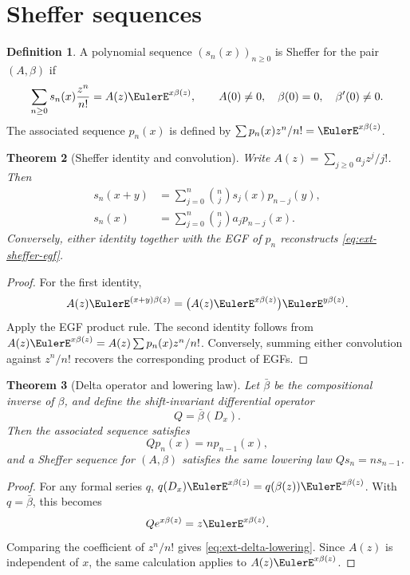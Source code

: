 \documentclass[11pt,a4paper,oneside,openany]{book}
\newtheorem{theorem}{Theorem}[chapter]
\theoremstyle{definition}
\newtheorem{definition}[theorem]{Definition}
\theoremstyle{remark}
\begin{document}
\section{Sheffer sequences}

\begin{definition}
A polynomial sequence \((s_n(x))_{n\ge0}\) is Sheffer for the pair
\((A,\beta)\) if
\begin{equation}\label{eq:ext-sheffer-egf}
 \sum_{n\ge0}s_n(x)\frac{z^n}{n!}
 =A(z)\EulerE^{x\beta(z)},
 \qquad A(0)\ne0,\quad \beta(0)=0,\quad \beta'(0)\ne0.
\end{equation}
The associated sequence \(p_n(x)\) is defined by
\(\sum p_n(x)z^n/n!=\EulerE^{x\beta(z)}\).
\end{definition}

\begin{theorem}[Sheffer identity and convolution]
Write \(A(z)=\sum_{j\ge0}a_jz^j/j!\).  Then
\begin{align}
 s_n(x+y)&=\sum_{j=0}^n\binom nj s_j(x)p_{n-j}(y),
 \label{eq:ext-sheffer-identity}\\
 s_n(x)&=\sum_{j=0}^n\binom nj a_jp_{n-j}(x).
 \label{eq:ext-sheffer-convolution}
\end{align}
Conversely, either identity together with the EGF of \(p_n\) reconstructs
\eqref{eq:ext-sheffer-egf}.
\end{theorem}
\begin{proof}
For the first identity,
\[
 A(z)\EulerE^{(x+y)\beta(z)}
 =\bigl(A(z)\EulerE^{x\beta(z)}\bigr)\EulerE^{y\beta(z)}.
\]
Apply the EGF product rule.  The second identity follows from
\(A(z)\EulerE^{x\beta(z)}=A(z)\sum p_n(x)z^n/n!\).  Conversely, summing either
convolution against \(z^n/n!\) recovers the corresponding product of EGFs.
\end{proof}

\begin{theorem}[Delta operator and lowering law]
Let \(\bar\beta\) be the compositional inverse of \(\beta\), and define the
shift-invariant differential operator
\begin{equation}\label{eq:ext-delta-operator}
 Q=\bar\beta(D_x).
\end{equation}
Then the associated sequence satisfies
\begin{equation}\label{eq:ext-delta-lowering}
 Qp_n(x)=np_{n-1}(x),
\end{equation}
and a Sheffer sequence for \((A,\beta)\) satisfies the same lowering law
\(Qs_n=ns_{n-1}\).
\end{theorem}
\begin{proof}
For any formal series \(q\),
\(q(D_x)\EulerE^{x\beta(z)}=q(\beta(z))\EulerE^{x\beta(z)}\).  With
\(q=\bar\beta\), this becomes
\[
 Qe^{x\beta(z)}=z \EulerE^{x\beta(z)}.
\]
Comparing the coefficient of \(z^n/n!\) gives
\eqref{eq:ext-delta-lowering}.  Since \(A(z)\) is independent of \(x\), the
same calculation applies to \(A(z)\EulerE^{x\beta(z)}\).
\end{proof}
\end{document}
